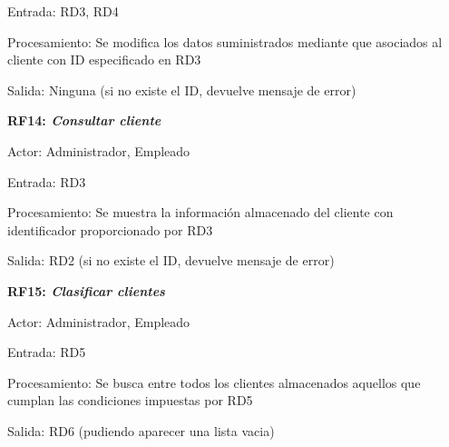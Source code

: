\documentclass[paper=a4, fontsize=11pt, spanish]{scrartcl}
\begin{document}
Entrada: RD3, RD4

Procesamiento: Se modifica los datos suministrados mediante que asociados al cliente con ID especificado en RD3

Salida: Ninguna (si no existe el ID, devuelve mensaje de error)

\setlength{\parindent}{0em}
\textbf{RF14: \textit{Consultar cliente}}
\setlength{\parindent}{2em}

Actor: Administrador, Empleado

Entrada: RD3

Procesamiento: Se muestra la información almacenado del cliente con identificador proporcionado por RD3

Salida:  RD2 (si no existe el ID, devuelve mensaje de error)

\setlength{\parindent}{0em}
\textbf{RF15: \textit{Clasificar clientes}}
\setlength{\parindent}{2em}

Actor: Administrador, Empleado

Entrada: RD5

Procesamiento:  Se busca entre todos los clientes almacenados aquellos que cumplan las condiciones impuestas por RD5

Salida: RD6 (pudiendo aparecer una lista vacia)
\end{document}
